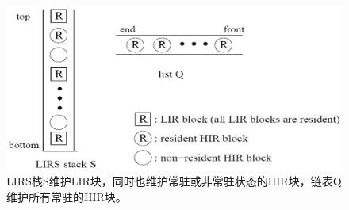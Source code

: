 \begin{figure}[H]
\centering
\includegraphics[keepaspectratio, scale=0.4]{pitures/lirsstack.png}
\caption{LIRS栈S维护LIR块，同时也维护常驻或非常驻状态的HIR块，链表Q维护所有常驻的HIR块。} 
\end{figure}


